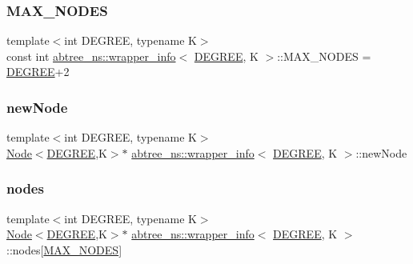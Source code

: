 \subsubsection{\texorpdfstring{M\+A\+X\+\_\+\+N\+O\+D\+ES}{MAX\_NODES}}
{\footnotesize\ttfamily template$<$int D\+E\+G\+R\+EE, typename K$>$ \\
const int \hyperlink{classabtree__ns_1_1wrapper__info}{abtree\+\_\+ns\+::wrapper\+\_\+info}$<$ \hyperlink{brown__sigouin__abtree__kcas_2adapter_8h_a5d88b17d70c985f2f2b8e987037fd6dd}{D\+E\+G\+R\+EE}, K $>$\+::M\+A\+X\+\_\+\+N\+O\+D\+ES = \hyperlink{brown__sigouin__abtree__kcas_2adapter_8h_a5d88b17d70c985f2f2b8e987037fd6dd}{D\+E\+G\+R\+EE}+2\hspace{0.3cm}{\ttfamily [static]}}

\mbox{\label{classabtree__ns_1_1wrapper__info_a5517be33957e4aace41140dad1738ef4}} 
\subsubsection{\texorpdfstring{new\+Node}{newNode}}
{\footnotesize\ttfamily template$<$int D\+E\+G\+R\+EE, typename K$>$ \\
\hyperlink{structabtree__ns_1_1Node}{Node}$<$\hyperlink{brown__sigouin__abtree__kcas_2adapter_8h_a5d88b17d70c985f2f2b8e987037fd6dd}{D\+E\+G\+R\+EE},K$>$$\ast$ \hyperlink{classabtree__ns_1_1wrapper__info}{abtree\+\_\+ns\+::wrapper\+\_\+info}$<$ \hyperlink{brown__sigouin__abtree__kcas_2adapter_8h_a5d88b17d70c985f2f2b8e987037fd6dd}{D\+E\+G\+R\+EE}, K $>$\+::new\+Node}

\mbox{\label{classabtree__ns_1_1wrapper__info_a6babdd3bb46ab432e506401eef25a5b2}} 
\subsubsection{\texorpdfstring{nodes}{nodes}}
{\footnotesize\ttfamily template$<$int D\+E\+G\+R\+EE, typename K$>$ \\
\hyperlink{structabtree__ns_1_1Node}{Node}$<$\hyperlink{brown__sigouin__abtree__kcas_2adapter_8h_a5d88b17d70c985f2f2b8e987037fd6dd}{D\+E\+G\+R\+EE},K$>$$\ast$ \hyperlink{classabtree__ns_1_1wrapper__info}{abtree\+\_\+ns\+::wrapper\+\_\+info}$<$ \hyperlink{brown__sigouin__abtree__kcas_2adapter_8h_a5d88b17d70c985f2f2b8e987037fd6dd}{D\+E\+G\+R\+EE}, K $>$\+::nodes\mbox{[}\hyperlink{classabtree__ns_1_1wrapper__info_a8ebdd932eb6c4c88615fbb76b8419d9e}{M\+A\+X\+\_\+\+N\+O\+D\+ES}\mbox{]}}

